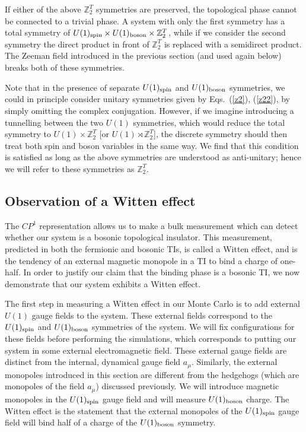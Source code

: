 \documentclass[prb,twocolumn]{revtex4-1}
\def\ztwot{\mathbb{Z}_2^T}
\newcommand{\cp}{$CP^1$ }
\begin{document}
If either of the above $\ztwot$ symmetries are preserved, the topological phase cannot be connected to a trivial phase. A system with only the first symmetry has a total symmetry of $U(1)_{\rm spin}\times U(1)_{\rm boson}\times \ztwot$, while if we consider the second symmetry the direct product in front of $\ztwot$ is replaced with a semidirect product. The Zeeman field introduced in the previous section (and used again below) breaks both of these symmetries.

Note that in the presence of separate $U(1)_{\rm spin}$ and $U(1)_{\rm boson}$ symmetries, we could in principle consider unitary symmetries given by Eqs.~(\ref{z2}), (\ref{z22}), by simply omitting the complex conjugation.  However, if we imagine introducing a tunnelling between the two $U(1)$ symmetries, which would reduce the total symmetry to $U(1)\times\ztwot$ [or $U(1)\rtimes\ztwot$], the discrete symmetry should then treat both spin and boson variables in the same way. We find that this condition is satisfied as long as the above symmetries are understood as anti-unitary; hence we will refer to these symmetries as $\ztwot$.


\subsection{Observation of a Witten effect}
The \cp representation allows us to make a bulk measurement which can detect whether our system is a bosonic topological insulator. This measurement, predicted in both the fermionic\cite{FranzWitten} and bosonic\cite{MaxWitten} TIs, is called a Witten effect, and is the tendency of an external magnetic monopole in a TI to bind a charge of one-half. 
In order to justify our claim that the binding phase is a bosonic TI, we now demonstrate that our system exhibits a Witten effect. 

The first step in measuring a Witten effect in our Monte Carlo is to add external $U(1)$ gauge fields to the system. These external fields correspond to the $U(1)_{\rm spin}$ and $U(1)_{\rm boson}$ symmetries of the system. We will fix configurations for these fields before performing the simulations, which corresponds to putting our system in some external electromagnetic field. These external gauge fields are distinct from the internal, dynamical gauge field $a_\mu$. Similarly, the external monopoles introduced in this section are different from the hedgehogs (which are monopoles of the field $a_\mu$) discussed previously. We will introduce magnetic monopoles in the $U(1)_{\rm spin}$ gauge field and will measure $U(1)_{\rm boson}$ charge. The Witten effect is the statement that the external monopoles of the $U(1)_{\rm spin}$ gauge field will bind half of a charge of the $U(1)_{\rm boson}$ symmetry.
\end{document}
